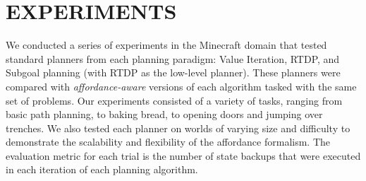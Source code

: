 \documentclass[]{article}
\newcommand{\stnote}[1]{\textcolor{Blue}{\textbf{ST: #1}}}
\newcommand{\jmnote}[1]{\textcolor{Green}{\textbf{JM: #1}}}
\begin{document}




\section{EXPERIMENTS}

%


We conducted a series of experiments in the Minecraft domain that
tested standard planners from each planning paradigm:
Value Iteration, RTDP, and Subgoal planning (with RTDP as the low-level
planner). These planners were compared with {\it affordance-aware}
versions of each algorithm tasked with the same set of problems. Our experiments consisted
of a variety of tasks, ranging from basic path planning, to baking bread, to opening doors 
and jumping over trenches.  We also tested each planner on worlds 
of varying size and difficulty to demonstrate the scalability and flexibility of the affordance
formalism. The evaluation metric for each trial is the number of state backups that were 
executed in each iteration of each planning algorithm.
\end{document}
